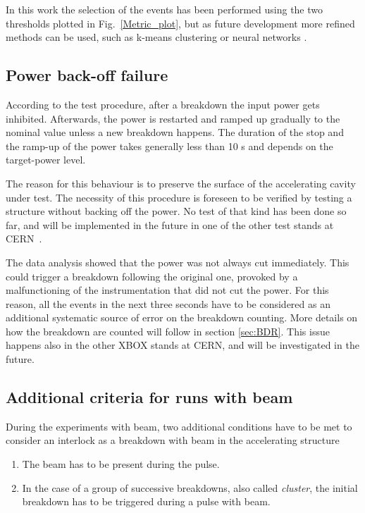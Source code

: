 In this work the selection of the events has been performed using the two thresholds plotted in Fig.~\ref{Metric_plot}, but as future development more refined methods can be used, such as k-means clustering or neural networks \cite{ML:book}.



\subsection{Power back-off failure}
\label{sec:pbof}

According to the test procedure, after a breakdown the input power gets inhibited. Afterwards, the power is restarted and ramped up gradually to the nominal value unless a new breakdown happens. The duration of the stop and the ramp-up of the power takes generally less than 10 s and depends on the target-power level.

The reason for this behaviour is to preserve the surface of the accelerating cavity under test. The necessity of this procedure is foreseen to be verified by testing a structure without backing off the power. No test of that kind has been done so far, and will be implemented in the future in one of the other test stands at CERN~\cite{Walter:PC}.

The data analysis showed that the power was not always cut immediately. This could trigger a breakdown  following the original one, provoked by a malfunctioning of the instrumentation that did not cut the power. For this reason, all the events in the next three seconds have to be considered as an additional systematic source of error on the breakdown counting. More details on how the breakdown are counted will follow in section \ref{sec:BDR}.  This issue happens also in the other XBOX stands at CERN, and will be investigated in the future. 


\subsection[Additional criteria for runs with beam]{Additional criteria for runs with beam}

During the experiments with beam, two additional conditions have to be met to consider an interlock as a breakdown with beam in the accelerating structure
\begin{enumerate}
\item The beam has to be present during the pulse.
\item In the case of a group of successive breakdowns, also called \textit{cluster}, the initial breakdown has to be triggered during a pulse with beam.
\end{enumerate}





